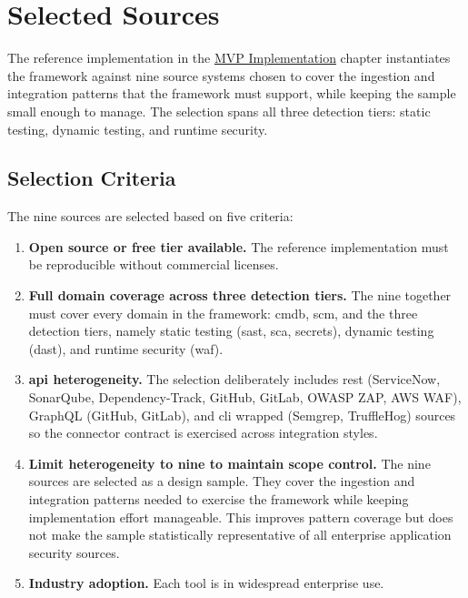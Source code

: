 
\section{Selected Sources}
\label{sec:selected-sources}

The reference implementation in the \hyperref[ch:implementation]{MVP Implementation} chapter instantiates the framework against nine source systems chosen to cover the ingestion and integration patterns that the framework must support, while keeping the sample small enough to manage. The selection spans all three detection tiers: static testing, dynamic testing, and runtime security.

\subsection{Selection Criteria}

The nine sources are selected based on five criteria:

\begin{enumerate}
    \item \textbf{Open source or free tier available.} The reference implementation must be reproducible without commercial licenses.
    \item \textbf{Full domain coverage across three detection tiers.} The nine together must cover every domain in the framework: \gls{cmdb}, \gls{scm}, and the three detection tiers, namely static testing (\gls{sast}, \gls{sca}, secrets), dynamic testing (\gls{dast}), and runtime security (\gls{waf}).
    \item \textbf{\Gls{api} heterogeneity.} The selection deliberately includes \gls{rest} (ServiceNow, SonarQube, Dependency-Track, GitHub, GitLab, OWASP ZAP, AWS WAF), GraphQL (GitHub, GitLab), and \gls{cli} wrapped (Semgrep, TruffleHog) sources so the connector contract is exercised across integration styles.
    \item \textbf{Limit heterogeneity to nine to maintain scope control.} The nine sources are selected as a design sample. They cover the ingestion and integration patterns needed to exercise the framework while keeping implementation effort manageable. This improves pattern coverage but does not make the sample statistically representative of all enterprise application security sources.
    \item \textbf{Industry adoption.} Each tool is in widespread enterprise use.
\end{enumerate}

